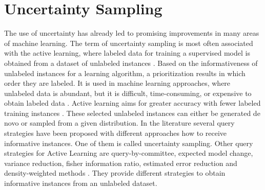 \section{Uncertainty Sampling} 
\label{sec:uncertaintysampling}
The use of uncertainty has already led to promising improvements in many areas of machine learning.
The term of uncertainty sampling is most often associated with the active learning, where labeled data for training a supervised model is obtained from a dataset of unlabeled instances \cite{Settles2009ActiveLL}.
Based on the informativeness of unlabeled instances for a learning algorithm, a prioritization results in which order they are labeled.
It is used in machine learning approaches, where unlabeled data is abundant, but it is difficult, time-consuming, or expensive to obtain labeled data \cite{Settles2009ActiveLL}.
Active learning aims for greater accuracy with fewer labeled training instances \cite{Settles2009ActiveLL}.
These selected unlabeled instances can either be generated de novo or sampled from a given distribution.
In the literature several query strategies have been proposed with different approaches how to receive informative instances.
One of them is called uncertainty sampling.
Other query strategies for Active Learning are query-by-committee, expected model change, variance reduction, fisher information ratio, estimated error reduction and density-weighted methods \cite{Settles2009ActiveLL}.
They provide different strategies to obtain informative instances from an unlabeled dataset.

